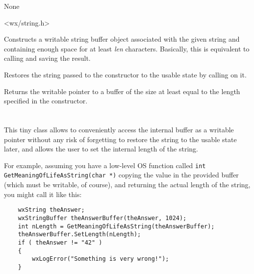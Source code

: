 
None


<wx/string.h>



\label{wxstringbufferctor}


Constructs a writable string buffer object associated with the given string
and containing enough space for at least {\it len} characters. Basically, this
is equivalent to calling  and
saving the result.


\label{wxstringbufferdtor}


Restores the string passed to the constructor to the usable state by calling 
 on it.


\label{wxstringbufferwxchar}


Returns the writable pointer to a buffer of the size at least equal to the
length specified in the constructor.



\section{}\label{wxstringbufferlength}

This tiny class allows to conveniently access the  
internal buffer as a writable pointer without any risk of forgetting to restore
the string to the usable state later, and allows the user to set the internal
length of the string.

For example, assuming you have a low-level OS function called 
{\tt int GetMeaningOfLifeAsString(char *)} copying the value in the provided
buffer (which must be writable, of course), and returning the actual length
of the string, you might call it like this:

\begin{verbatim}
    wxString theAnswer;
    wxStringBuffer theAnswerBuffer(theAnswer, 1024);
    int nLength = GetMeaningOfLifeAsString(theAnswerBuffer);
    theAnswerBuffer.SetLength(nLength);
    if ( theAnswer != "42" )
    {
        wxLogError("Something is very wrong!");
    }
\end{verbatim}

